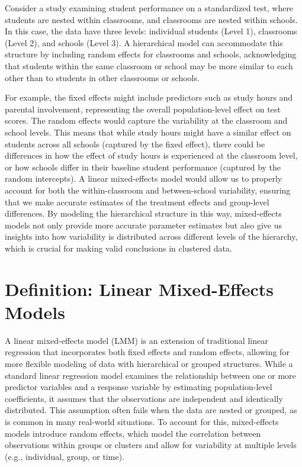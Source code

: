 Consider a study examining student performance on a standardized test, where students are nested within classrooms, and classrooms are nested within schools. In this case, the data have three levels: individual students (Level 1), classrooms (Level 2), and schools (Level 3). A hierarchical model can accommodate this structure by including random effects for classrooms and schools, acknowledging that students within the same classroom or school may be more similar to each other than to students in other classrooms or schools.

For example, the fixed effects might include predictors such as study hours and parental involvement, representing the overall population-level effect on test scores. The random effects would capture the variability at the classroom and school levels. This means that while study hours might have a similar effect on students across all schools (captured by the fixed effect), there could be differences in how the effect of study hours is experienced at the classroom level, or how schools differ in their baseline student performance (captured by the random intercepts). A linear mixed-effects model would allow us to properly account for both the within-classroom and between-school variability, ensuring that we make accurate estimates of the treatment effects and group-level differences. By modeling the hierarchical structure in this way, mixed-effects models not only provide more accurate parameter estimates but also give us insights into how variability is distributed across different levels of the hierarchy, which is crucial for making valid conclusions in clustered data.

\section{Definition: Linear Mixed-Effects Models}
A linear mixed-effects model (LMM) is an extension of traditional linear regression that incorporates both fixed effects and random effects, allowing for more flexible modeling of data with hierarchical or grouped structures. While a standard linear regression model examines the relationship between one or more predictor variables and a response variable by estimating population-level coefficients, it assumes that the observations are independent and identically distributed. This assumption often fails when the data are nested or grouped, as is common in many real-world situations. To account for this, mixed-effects models introduce random effects, which model the correlation between observations within groups or clusters and allow for variability at multiple levels (e.g., individual, group, or time).


